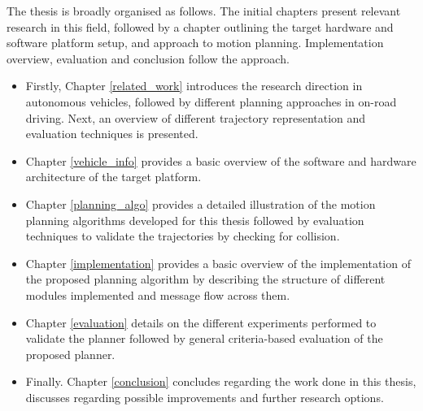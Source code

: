 The thesis is broadly organised as follows. The initial chapters present relevant research in this field, followed by a chapter outlining the target hardware and software platform setup, and approach to motion planning. Implementation overview, evaluation and conclusion follow the approach.
\begin{itemize}
	\item Firstly, Chapter \ref{related_work} introduces the research direction in autonomous vehicles, followed by different planning approaches in on-road driving. Next, an overview of different trajectory representation and evaluation techniques is presented.
	\item Chapter \ref{vehicle_info} provides a basic overview of the software and hardware architecture of the target platform.
	\item Chapter \ref{planning_algo} provides a detailed illustration of the motion planning algorithms developed for this thesis followed by evaluation techniques to validate the trajectories by checking for collision.
	\item Chapter \ref{implementation} provides a basic overview of the implementation of the proposed planning algorithm by describing the structure of different modules implemented and message flow across them.
	\item Chapter \ref{evaluation} details on the different experiments performed to validate the planner followed by general criteria-based evaluation of the proposed planner.
	\item Finally. Chapter \ref{conclusion} concludes regarding the work done in this thesis, discusses regarding possible improvements and further research options.
	
	
	
\end{itemize}












